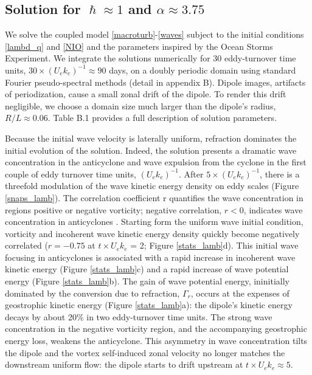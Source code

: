 \documentclass{jfm}
\begin{document}
\subsection{Solution for $\hslash \approx 1$ and $\alpha \approx 3.75$}
We solve the coupled model \eqref{macroturb}-\eqref{waves} subject to the
initial conditions \eqref{lambd_q} and \eqref{NIO} and the parameters inspired
by the Ocean Storms Experiment. We integrate the solutions numerically
 for $30$ eddy-turnover time units,
$30\times (U_e k_e)^{-1}\approx 90$ days, on a
doubly periodic domain using standard Fourier pseudo-spectral methods (detail in appendix B).
Dipole images, artifacts of periodization,
cause a small zonal drift of the dipole. To render this drift negligible, we
choose a domain size much larger than the dipole's radius, $R/L \approx 0.06$.
Table B.1 provides a full description of solution parameters.

Because the initial wave velocity is laterally uniform, refraction dominates
the initial evolution of the solution.
Indeed, the solution presents a dramatic wave concentration
in the anticyclone and wave expulsion from the cyclone in the first couple of
eddy turnover time units, $(U_e k_e)^{-1}$. After $5 \times (U_e k_e)^{-1}$, there
is a threefold modulation of the wave kinetic energy density on eddy scales
(Figure \ref{snaps_lamb}). The  correlation coefficient
\beq
\label{corr_r}
r  {}\com
\eeq
quantifies the wave concentration in regions positive or negative vorticity;
negative correlation, $r<0$, indicates wave concentration in anticyclones
\citep{danioux_etal2015}. Starting form the uniform wave initial condition,
vorticity and incoherent wave kinetic energy density
quickly become negatively correlated ($r=-0.75$ at $t\times U_e k_e$ = 2;
Figure \ref{stats_lamb}d). This initial wave focusing in anticyclones is associated
with a rapid increase in incoherent wave kinetic energy (Figure \ref{stats_lamb}c)
and a rapid increase of wave potential energy (Figure \ref{stats_lamb}b). The gain of
wave potential energy, ininitially dominated by the conversion due to refraction,
$\Gamma_r$,
 occurs at the expenses of geostrophic kinetic energy
(Figure \ref{stats_lamb}a):
the dipole's kinetic energy decays by about 20$\%$ in two eddy-turnover time units.
The strong wave concentration in the negative vorticity region, and the accompanying
geostrophic energy loss, weakens the anticyclone.  This asymmetry in wave concentration
tilts the dipole and the vortex self-induced zonal velocity no longer matches the
downstream uniform flow: the dipole starts to drift upstream at $t\times U_e
k_e \approx 5$.
\end{document}

